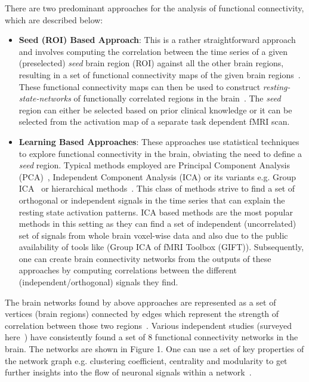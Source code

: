 \documentclass{llncs}
\begin{document}
There are two predominant approaches for the analysis of functional connectivity, which are described below:
\begin{itemize}
\item {\bf Seed (ROI) Based Approach}:  This is a rather straightforward approach and involves computing the correlation between the time series of a given (preselected) {\it seed} brain region (ROI) against all the other brain regions, resulting in a set of functional connectivity maps of the given brain regions~\cite{biswal1997simultaneous,cordes2000mapping}. These functional connectivity maps can then be used to construct {\it resting-state-networks} of functionally correlated regions in the brain~\cite{damoiseaux2006consistent,fox2005human,beckmann2005investigations}. The {\it seed} region can either be selected based on prior clinical knowledge or it can be selected from the activation map of a separate task dependent fMRI scan.
\item {\bf Learning Based Approaches}: These approaches use statistical techniques to explore functional connectivity in the brain, obviating the need to define a {\it seed} region. Typical methods employed are Principal Component Analysis (PCA)~\cite{friston1998disconnection}, Independent Component Analysis (ICA) or its variants e.g. Group ICA~\cite{beckmann2005investigations,calhoun2001method,petrella2011default} or hierarchical methods~\cite{cordes2002hierarchical,salvador2005neurophysiological}. This class of methods strive to find a set of orthogonal or independent signals in the time series that can explain the resting state activation patterns. ICA based methods are the most popular methods in this setting as they can find a set of independent (uncorrelated) set of signals from whole brain voxel-wise data and also due to the public availability of  tools like (Group ICA of fMRI Toolbox (GIFT)). Subsequently, one can create brain connectivity networks from the outputs of these approaches by computing correlations between the different (independent/orthogonal) signals they find.
 \end{itemize} 


The brain networks found by above approaches are represented as a set of vertices (brain regions) connected by edges which represent the strength of correlation between those two regions~\cite{he2010graph,stam2007graph}. Various independent studies (surveyed here~\cite{van2010exploring}) have consistently found a set of 8 functional connectivity networks in the brain. The networks are shown in Figure 1. One can use a set of key properties of the network graph e.g. clustering coefficient, centrality and modularity to get further insights into the flow of neuronal signals within a network~\cite{he2010graph,stam2007graph}.
\end{document}

